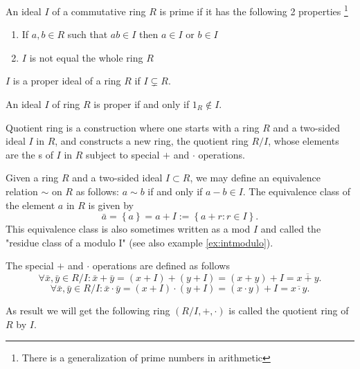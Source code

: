 \begin{appendices}
\begin{definition}
  An ideal $I$ of a commutative ring $R$ is prime if it has the
  following 2 properties
  \footnote{
    There is a generalization of prime numbers in arithmetic
  }
  \begin{enumerate}
  \item If $a,b \in R$ such that $ab \in I$ then $a \in I$ or $b \in I$
  \item$I$ is not equal the whole ring $R$
  \end{enumerate}
  \label {def:primeideal}
\end{definition}

\begin{definition}
$I$ is a proper ideal of a ring $R$ if $I \subsetneq R$.
\label{def:properideal}
\end{definition}

\begin{theorem}
  An ideal $I$ of ring $R$ is proper if and only if $1_R \notin I$.
  \label{thm:properideal}
\end{theorem}

\begin{definition}
  Quotient ring is a construction where one
  starts with a ring $R$ and a two-sided ideal $I$ in $R$, and constructs a
  new ring, the quotient ring $R/I$, whose elements are the
  s of $I$ 
  in $R$ subject to special $+$ and $\cdot$ operations.

  Given a ring $R$ and a two-sided ideal $I \subset R$, we may define
  an equivalence relation $\sim$ on $R$ as follows: 
  $a \sim b$ if and only if $a - b \in I$.
  The equivalence class of the element $a$ in $R$ is given by
  \[
  \bar{a} = \left\{a\right\} = a + I := \left\{ a + r : r \in I \right\}.
  \]
  This equivalence class is also sometimes written as a mod $I$ and
  called the "residue class of a modulo I" (see also example
  \ref{ex:intmodulo}).

  The special $+$ and $\cdot$ operations are defined as follows
  \[
  \forall \bar{x},\bar{y} \in R/I:
  \bar{x} + \bar{y} = \left(x + I\right) + \left(y + I\right) =
  \left(x+y\right) + I = \overline{x+y}.
  \]
  \[
  \forall \bar{x},\bar{y} \in R/I:
  \bar{x} \cdot \bar{y} = \left(x + I\right) \cdot \left(y + I\right) =
  \left(x \cdot y\right) + I = \overline{x \cdot y}.
  \]

  As result we will get the following ring $\left(R/I, +,
  \cdot\right)$ is called the quotient ring of $R$ by $I$.
  \label{def:quotientring}
\end{definition}


\end{appendices}

